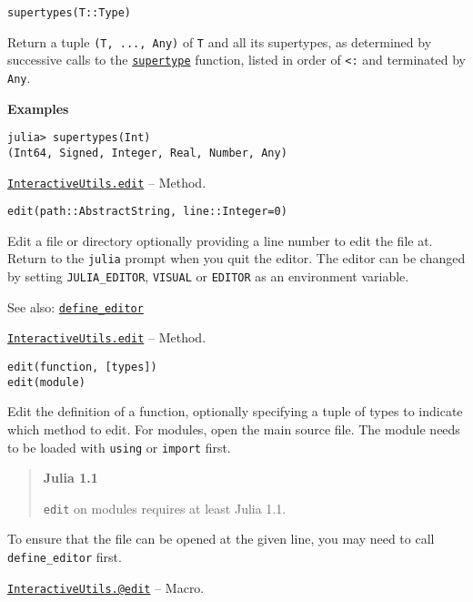 \begin{adjustwidth}{2em}{0pt}


\begin{verbatim}
supertypes(T::Type)
\end{verbatim}

Return a tuple \texttt{(T, ..., Any)} of \texttt{T} and all its supertypes, as determined by successive calls to the \hyperlink{12192788431675298651}{\texttt{supertype}} function, listed in order of \texttt{<:} and terminated by \texttt{Any}.

\textbf{Examples}


\begin{verbatim}
julia> supertypes(Int)
(Int64, Signed, Integer, Real, Number, Any)
\end{verbatim}



\end{adjustwidth}
\hypertarget{7452583831414689960}{}
\hyperlink{7452583831414689960}{\texttt{InteractiveUtils.edit}}  -- {Method.}

\begin{adjustwidth}{2em}{0pt}


\begin{verbatim}
edit(path::AbstractString, line::Integer=0)
\end{verbatim}

Edit a file or directory optionally providing a line number to edit the file at. Return to the \texttt{julia} prompt when you quit the editor. The editor can be changed by setting \texttt{JULIA\_EDITOR}, \texttt{VISUAL} or \texttt{EDITOR} as an environment variable.

See also: \hyperlink{7329923191421757530}{\texttt{define\_editor}}



\end{adjustwidth}
\hypertarget{5817135015306723574}{}
\hyperlink{5817135015306723574}{\texttt{InteractiveUtils.edit}}  -- {Method.}

\begin{adjustwidth}{2em}{0pt}


\begin{verbatim}
edit(function, [types])
edit(module)
\end{verbatim}

Edit the definition of a function, optionally specifying a tuple of types to indicate which method to edit. For modules, open the main source file. The module needs to be loaded with \texttt{using} or \texttt{import} first.

\begin{quote}
\textbf{Julia 1.1}

\texttt{edit} on modules requires at least Julia 1.1.

\end{quote}
To ensure that the file can be opened at the given line, you may need to call \texttt{define\_editor} first.



\end{adjustwidth}
\hypertarget{15808508619915684107}{}
\hyperlink{15808508619915684107}{\texttt{InteractiveUtils.@edit}}  -- {Macro.}

